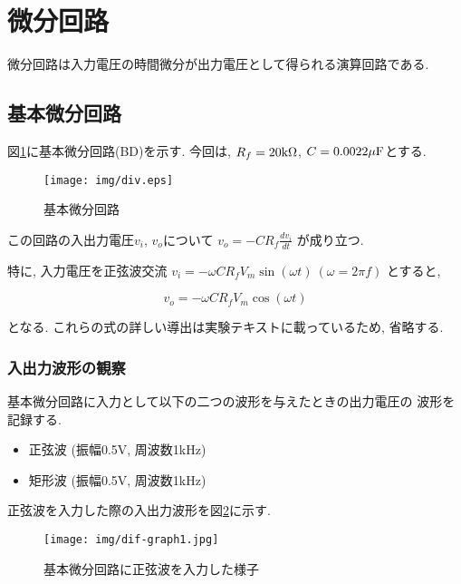 \documentclass[titlepage]{jsarticle}
\begin{document}
\section{微分回路}
    微分回路は入力電圧の時間微分が出力電圧として得られる演算回路である.
    
    \subsection{基本微分回路}
        図\ref{fig:dif}に基本微分回路(BD)を示す.
        今回は, $R_f = 20\rm{k\Omega}$, $C = 0.0022\rm{\mu F}$とする.

        \begin{figure}[h]
            \centering
            \texttt{[image: img/div.eps]}
            \caption{基本微分回路}
            \label{fig:dif}
        \end{figure}

        この回路の入出力電圧$v_i$, $v_o$について
        $\displaystyle v_o = -CR_f\frac{dv_i}{dt}$
        が成り立つ.

        特に, 入力電圧を正弦波交流
        $v_i = -\omega CR_fV_m\sin(\omega t) \ (\omega = 2\pi f)$
        とすると,

        \begin{equation}
            v_o = -\omega CR_fV_m\cos(\omega t) \label{equ:dif}
        \end{equation}

        となる.
        これらの式の詳しい導出は実験テキスト\cite{text}に載っているため,
        省略する.

        \subsubsection{入出力波形の観察}
            基本微分回路に入力として以下の二つの波形を与えたときの出力電圧の
            波形を記録する.

            \begin{itemize}
                \item 正弦波 (振幅0.5V, 周波数1kHz)
                \item 矩形波 (振幅0.5V, 周波数1kHz)
            \end{itemize}

            正弦波を入力した際の入出力波形を図\ref{fig:dif1}に示す.

            \begin{figure}[h]
                \centering
                \texttt{[image: img/dif-graph1.jpg]}
                \caption{基本微分回路に正弦波を入力した様子}
                \label{fig:dif1}
            \end{figure}
\end{document}
